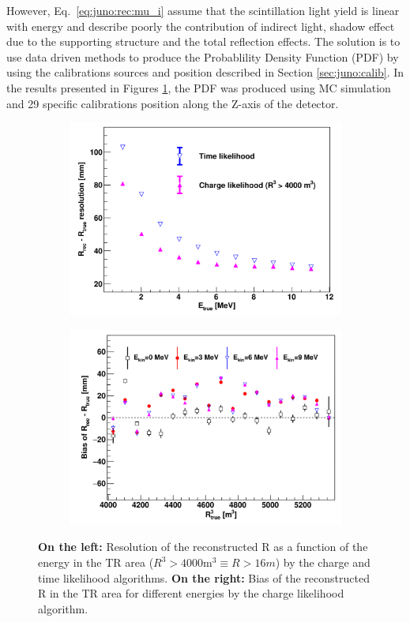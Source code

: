 \documentclass[../main.tex]{subfiles}
\begin{document}
However, Eq.\ \ref{eq:juno:rec:mu_i} assume that the scintillation light yield is linear with energy and describe poorly the contribution of indirect light, shadow effect due to the supporting structure and the total reflection effects. The solution is to use data driven methods to produce the Probablility Density Function (PDF) by using the calibrations sources and position described in Section \ref{sec:juno:calib}. In the results presented in Figures \ref{fig:juno:rec:time_charge_results}, the PDF was produced using MC simulation and 29 specific calibrations position \cite{li_event_2021} along the Z-axis of the detector.
\begin{figure}[ht]
  \centering
  \begin{subfigure}[b]{0.48\linewidth}
    \centering
    \includegraphics[width=\textwidth]{images/juno/reco/charge_likelihood_res.png}
  \end{subfigure}
  \hfill
  \begin{subfigure}[b]{0.48\linewidth}
    \centering
    \includegraphics[width=\textwidth]{images/juno/reco/charge_likelihood_bias.png}
  \end{subfigure}
  \caption{\textbf{On the left:} Resolution of the reconstructed R as a function of the energy in the TR area ($R^3 > 4000 \mathrm{m}^3 \equiv R > 16 m$) by the charge and time likelihood algorithms. \textbf{On the right:} Bias of the reconstructed R in the TR area for different energies by the charge likelihood algorithm.}
  \label{fig:juno:rec:time_charge_results}
\end{figure}
\end{document}
